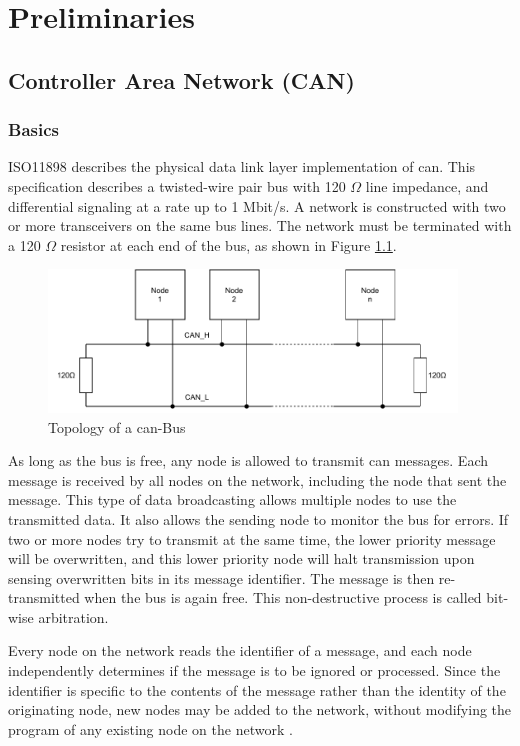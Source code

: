 \chapter{Preliminaries}
\section{Controller Area Network (CAN)}
\subsection{Basics}
ISO11898 describes the physical data link layer implementation of \acrshort{can}. This specification describes a twisted-wire pair bus with 120 $\Omega$ line impedance, and differential signaling at a rate up to 1 Mbit/s. A network is constructed with two or more transceivers on the same bus lines. The network must be terminated with a 120 $\Omega$ resistor at each end of the bus, as shown in Figure \ref{fig:can-bus_topology}.

\begin{figure}[h!]
	\centering
	\includegraphics[height=3.8cm]{images/can-bus_topology}
	\caption{Topology of a \acrshort{can}-Bus}
	\label{fig:can-bus_topology}
\end{figure}

As long as the bus is free, any node is allowed to transmit \acrshort{can} messages. Each message is received by all nodes on the network, including the node that sent the message. This type of data broadcasting allows multiple nodes to use the transmitted data. It also allows the sending node to monitor the bus for errors. If two or more nodes try to transmit at the same time, the lower priority message will be overwritten, and this lower priority node will halt transmission upon sensing overwritten bits in its message identifier. The message is then re-transmitted when the bus is again free. This non-destructive process is called bit-wise arbitration.

Every node on the network reads the identifier of a message, and each node independently determines if the message is to be ignored or processed. Since the identifier is specific to the contents of the message rather than the identity of the originating node, new nodes may be added to the network, without modifying the program of any existing node on the network \cite{ti_can_transceivers}.
\newpage

